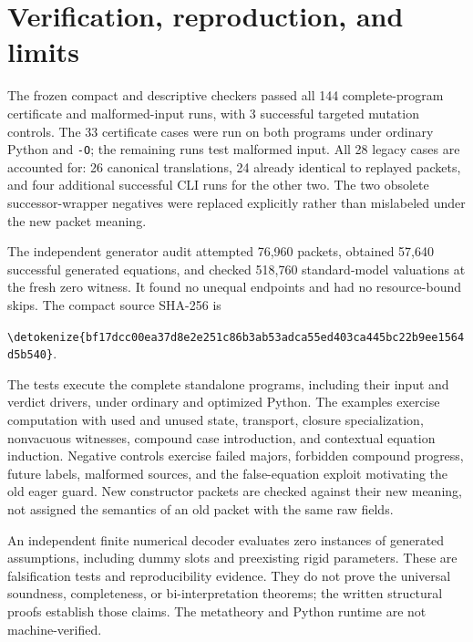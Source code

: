 \documentclass[11pt,letterpaper]{article}
\theoremstyle{definition}\newtheorem{definition}[theorem]{Definition}
\theoremstyle{remark}\newtheorem{remark}[theorem]{Remark}
\newcommand{\file}[1]{\expandafter\nolinkurl\expandafter{\detokenize{#1}}}
\begin{document}
\section{Verification, reproduction, and limits}
\label{sec:evidence}

The frozen compact and descriptive checkers passed all 144 complete-program certificate and malformed-input runs, with 3 successful targeted mutation controls. The 33 certificate cases were run on both programs under ordinary Python and \texttt{-O}; the remaining runs test malformed input. All 28 legacy cases are accounted for: 26 canonical translations, 24 already identical to replayed packets, and four additional successful CLI runs for the other two. The two obsolete successor-wrapper negatives were replaced explicitly rather than mislabeled under the new packet meaning.

The independent generator audit attempted 76,960 packets, obtained 57,640 successful generated equations, and checked 518,760 standard-model valuations at the fresh zero witness. It found no unequal endpoints and had no resource-bound skips. The compact source SHA-256 is
\begin{center}\footnotesize\file{bf17dcc00ea37d8e2e251c86b3ab53adca55ed403ca445bc22b9ee1564d5b540}.\end{center}




The tests execute the complete standalone programs, including their
input and verdict drivers, under ordinary and optimized Python. The
examples exercise computation with used and unused state, transport,
closure specialization, nonvacuous witnesses, compound case introduction,
and contextual equation induction. Negative controls exercise failed
majors, forbidden compound progress, future labels, malformed sources,
and the false-equation exploit motivating the old eager guard. New
constructor packets are checked against their new meaning, not assigned
the semantics of an old packet with the same raw fields.

An independent finite numerical decoder evaluates zero instances of
generated assumptions, including dummy slots and preexisting rigid
parameters. These are falsification tests and reproducibility evidence.
They do not prove the universal soundness, completeness, or
bi-interpretation theorems; the written structural proofs establish
those claims. The metatheory and Python runtime are not machine-verified.
\end{document}
